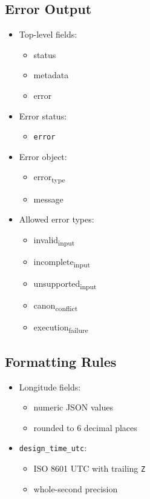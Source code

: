 \documentclass[11pt]{article}
\begin{document}
\subsection{Error Output}
\label{sec:org9275160}
\begin{itemize}
\item Top-level fields:
\begin{itemize}
\item status
\item metadata
\item error
\end{itemize}
\item Error status:
\begin{itemize}
\item \texttt{error}
\end{itemize}
\item Error object:
\begin{itemize}
\item error\textsubscript{type}
\item message
\end{itemize}
\item Allowed error types:
\begin{itemize}
\item invalid\textsubscript{input}
\item incomplete\textsubscript{input}
\item unsupported\textsubscript{input}
\item canon\textsubscript{conflict}
\item execution\textsubscript{failure}
\end{itemize}
\end{itemize}
\subsection{Formatting Rules}
\label{sec:org840a52b}
\begin{itemize}
\item Longitude fields:
\begin{itemize}
\item numeric JSON values
\item rounded to 6 decimal places
\end{itemize}
\item \texttt{design\_time\_utc}:
\begin{itemize}
\item ISO 8601 UTC with trailing \texttt{Z}
\item whole-second precision
\end{itemize}
\end{itemize}
\end{document}
